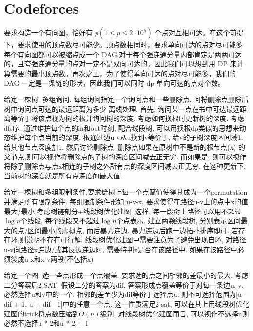 \section{Codeforces}

\prob 要求构造一个有向图，恰好有 $p (1 \leq p \leq 2 \cdot 10^5)$ 个点对互相可达。在这个前提下，要求使用的顶点数尽可能少。顶点数相同时，要求单向可达的点对尽可能多
\sol 每个有向图都可以被缩点成一个 DAG,对于每个强连通分量内部肯定是两两可达的，且夸强连通分量的点对一定不是双向可达的。因此我们可以想到用 DP 来计算需要的最小顶点数。再次之上，为了使得单向可达的点对尽可能多，我们的 DAG 一定是一条链的形状，因此我们可以同时 dp 单向可达的点对个数。

\prob 给定一棵树, 多组询问. 每组询问指定一个询问点和一些删除点, 问将删除点删除后树中询问点可达的最远距离为多少
\sol 离线处理. 首先, 询问某一点在书中可达最远距离等价于将该点视为树的根并询问树的深度. 考虑如何换根时更新树的深度. 考虑dfs序. 通过维护每个点的in和out时刻, 配合线段树, 可以用换根dp类似的思想来动态维护每个点当前的深度. 根通过边u-v从u换到v等价于, 给v的子树深度区间减1, 给其他节点深度加1. 然后讨论删除点. 删除点如果在原树中不是新的根节点(x) 的父节点,则可以视作将删除点的子树的深度区间减去正无穷. 而如果是, 则可以视作将除了删除点与点x相连的子树之外所有点的深度区间减去正无穷. 在这种更新下, 当前树的深度就是所有点深度的最大值.

\prob 给定一棵树和多组限制条件,要求给树上每一个点赋值使得其成为一个permutation并满足所有限制条件. 每组限制条件形如 u-v-x, 要求使得在路径u-v上的点中x的值最大/最小
\sol 考虑树链剖分+线段树优化建图. 这样, 每一段树上路径可以用不超过$\log{n}$个线段, 每个线段又不超过$\log{n}$个点表示. 建立两颗线段树, 分别表示区间最大的点/区间最小的虚拟点, 而后暴力连边. 暴力连边后跑一边拓扑排序即可. 若存在环,则说明不存在可行解. 线段树优化建图中需要注意为了避免出现自环, 对路径u-v向路径x连边/或其反边连边时, 需要特判x是否在该路径中. 如果在该路径中必须裂成u-x和x-v两段(不包括x)

\prob 给定一个图, 选一些点形成一个点覆盖. 要求选的点之间相邻的差最小的最大.
\sol 考虑二分答案后2-SAT. 假设二分的答案为dif. 答案形成点覆盖等价于对每一条边u, v, 必然选择u和v中的一个. 相邻的差至少为dif等价于选择点u, 则不可选择范围为[u - dif + 1, u + dif - 1]中的任意一个点. 这一性质满足2-sat, 可以在其上用线段树优化建图的trick将点数压缩到$O(n)$级别. 对线段树优化建图而言, 可以视作不选择u则必然不选择u * 2和u * 2 + 1